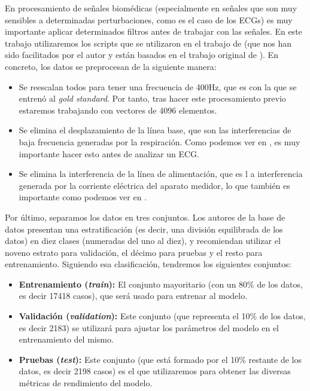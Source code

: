 En procesamiento de señales biomédicas (especialmente en señales que son muy sensibles a determinadas perturbaciones, como es el caso de los ECGs) es muy importante aplicar determinados filtros antes de trabajar con las señales. En este trabajo utilizaremos los scripts que se utilizaron en el trabajo de \cite{TFGSergio} (que nos han sido facilitados por el autor y están basados en el trabajo original de \cite{ribeiro}). En concreto, los datos se preprocesan de la siguiente manera:
\begin{itemize}
	\item Se reescalan todos para tener una frecuencia de 400Hz, que es con la que se entrenó al \emph{gold standard}. Por tanto, tras hacer este procesamiento previo estaremos trabajando con vectores de 4096 elementos.
	\item Se elimina el desplazamiento de la línea base, que son las interferencias de baja frecuencia generadas por la respiración. Como podemos ver en \cite{baseline}, es muy importante hacer esto antes de analizar un ECG.
	\item Se elimina la interferencia de la línea de alimentación, que es l a interferencia generada por la corriente eléctrica del aparato medidor, lo que también es importante como podemos ver en \cite{powerline}.
\end{itemize}

Por último, separamos los datos en tres conjuntos. Los autores de la base de datos presentan una estratificación (es decir, una división equilibrada de los datos) en diez clases (numeradas del uno al diez), y recomiendan utilizar el noveno estrato para validación, el décimo para pruebas y el resto para entrenamiento. Siguiendo esa clasificación, tendremos los siguientes conjuntos:
\begin{itemize}
	\item \textbf{Entrenamiento (\emph{train}):} El conjunto mayoritario (con un 80\% de los datos, es decir 17418 casos), que será usado para entrenar al modelo.
	\item \textbf{Validación (\emph{validation}):} Este conjunto (que representa el 10\% de los datos, es decir 2183) se utilizará para ajustar los parámetros del modelo en el entrenamiento del mismo.
	\item \textbf{Pruebas (\emph{test}):} Este conjunto (que está formado por el 10\% restante de los datos, es decir 2198 casos) es el que utilizaremos para obtener las diversas métricas de rendimiento del modelo.
\end{itemize}

